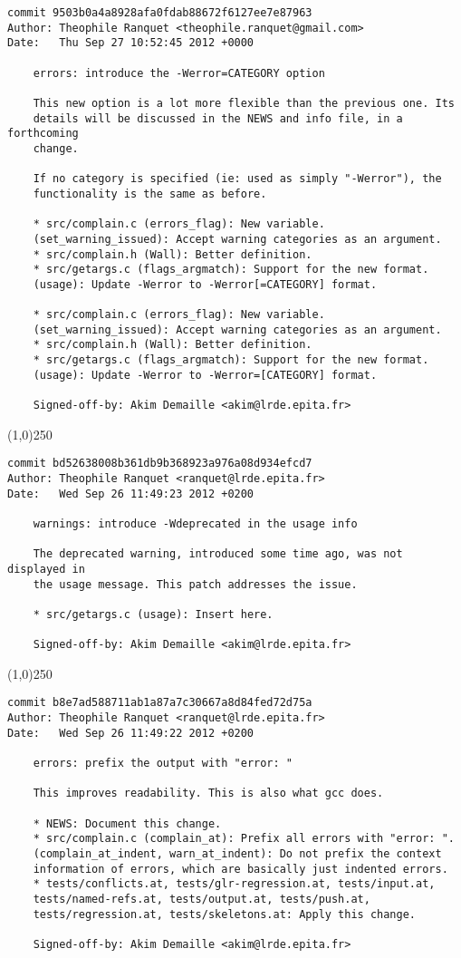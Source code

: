 \begin{verbatim}
commit 9503b0a4a8928afa0fdab88672f6127ee7e87963
Author: Theophile Ranquet <theophile.ranquet@gmail.com>
Date:   Thu Sep 27 10:52:45 2012 +0000

    errors: introduce the -Werror=CATEGORY option
    
    This new option is a lot more flexible than the previous one. Its
    details will be discussed in the NEWS and info file, in a forthcoming
    change.
    
    If no category is specified (ie: used as simply "-Werror"), the
    functionality is the same as before.
    
    * src/complain.c (errors_flag): New variable.
    (set_warning_issued): Accept warning categories as an argument.
    * src/complain.h (Wall): Better definition.
    * src/getargs.c (flags_argmatch): Support for the new format.
    (usage): Update -Werror to -Werror[=CATEGORY] format.
    
    * src/complain.c (errors_flag): New variable.
    (set_warning_issued): Accept warning categories as an argument.
    * src/complain.h (Wall): Better definition.
    * src/getargs.c (flags_argmatch): Support for the new format.
    (usage): Update -Werror to -Werror=[CATEGORY] format.
    
    Signed-off-by: Akim Demaille <akim@lrde.epita.fr>

\end{verbatim}
\line(1,0){250}
\begin{verbatim}
commit bd52638008b361db9b368923a976a08d934efcd7
Author: Theophile Ranquet <ranquet@lrde.epita.fr>
Date:   Wed Sep 26 11:49:23 2012 +0200

    warnings: introduce -Wdeprecated in the usage info
    
    The deprecated warning, introduced some time ago, was not displayed in
    the usage message. This patch addresses the issue.
    
    * src/getargs.c (usage): Insert here.
    
    Signed-off-by: Akim Demaille <akim@lrde.epita.fr>

\end{verbatim}
\line(1,0){250}
\begin{verbatim}
commit b8e7ad588711ab1a87a7c30667a8d84fed72d75a
Author: Theophile Ranquet <ranquet@lrde.epita.fr>
Date:   Wed Sep 26 11:49:22 2012 +0200

    errors: prefix the output with "error: "
    
    This improves readability. This is also what gcc does.
    
    * NEWS: Document this change.
    * src/complain.c (complain_at): Prefix all errors with "error: ".
    (complain_at_indent, warn_at_indent): Do not prefix the context
    information of errors, which are basically just indented errors.
    * tests/conflicts.at, tests/glr-regression.at, tests/input.at,
    tests/named-refs.at, tests/output.at, tests/push.at,
    tests/regression.at, tests/skeletons.at: Apply this change.
    
    Signed-off-by: Akim Demaille <akim@lrde.epita.fr>

\end{verbatim}
